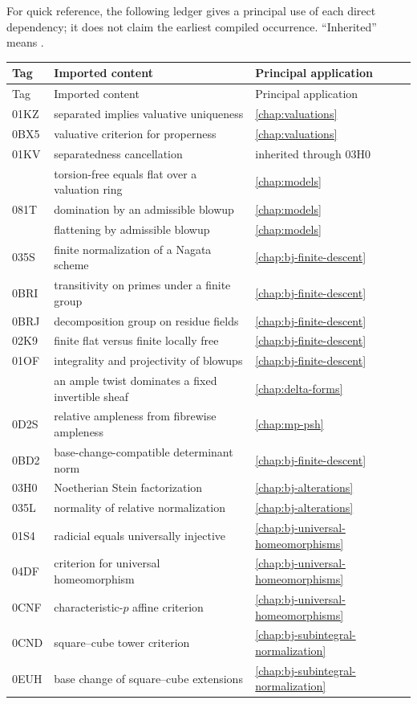 For quick reference, the following ledger gives a principal use of
each direct dependency; it does not claim the earliest compiled occurrence. “Inherited” means
.
\begingroup
\small
\setlength{\tabcolsep}{8pt}
\begin{longtable}{@{}
  >{\raggedright\arraybackslash}p{}
  >{\raggedright\arraybackslash}p{}
  >{\raggedright\arraybackslash}p{}@{}}
\toprule
Tag & Imported content & Principal application\\
\midrule
\endfirsthead
\toprule
Tag & Imported content & Principal application\\
\midrule
\endhead
\midrule
\endfoot
\bottomrule
\endlastfoot
01KZ & separated implies valuative uniqueness & \cref{chap:valuations}\\
0BX5 & valuative criterion for properness & \cref{chap:valuations}\\
01KV & separatedness cancellation & inherited through 03H0\\
0539 & torsion-free equals flat over a valuation ring & \cref{chap:models}\\
081T & domination by an admissible blowup & \cref{chap:models}\\
0815 & flattening by admissible blowup & \cref{chap:models}\\
035S & finite normalization of a Nagata scheme & \cref{chap:bj-finite-descent}\\
0BRI & transitivity on primes under a finite group & \cref{chap:bj-finite-descent}\\
0BRJ & decomposition group on residue fields & \cref{chap:bj-finite-descent}\\
02K9 & finite flat versus finite locally free & \cref{chap:bj-finite-descent}\\
01OF & integrality and projectivity of blowups & \cref{chap:bj-finite-descent}\\
0892 & an ample twist dominates a fixed invertible sheaf & \cref{chap:delta-forms}\\
0D2S & relative ampleness from fibrewise ampleness & \cref{chap:mp-psh}\\
0BD2 & base-change-compatible determinant norm & \cref{chap:bj-finite-descent}\\
03H0 & Noetherian Stein factorization & \cref{chap:bj-alterations}\\
035L & normality of relative normalization & \cref{chap:bj-alterations}\\
01S4 & radicial equals universally injective & \cref{chap:bj-universal-homeomorphisms}\\
04DF & criterion for universal homeomorphism & \cref{chap:bj-universal-homeomorphisms}\\
0CNF & characteristic-\(p\) affine criterion & \cref{chap:bj-universal-homeomorphisms}\\
0CND & square--cube tower criterion & \cref{chap:bj-subintegral-normalization}\\
0EUH & base change of square--cube extensions & \cref{chap:bj-subintegral-normalization}\\
\end{longtable}
\endgroup

